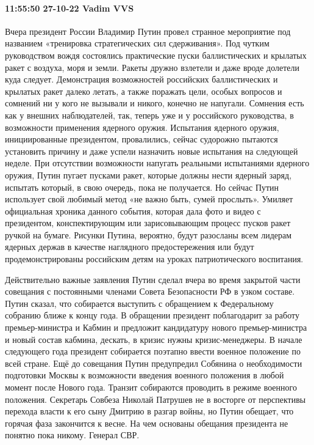 \paragraph{11:55:50 27-10-22 Vadim VVS}

Вчера президент России Владимир Путин провел странное мероприятие под названием
«тренировка стратегических сил сдерживания». Под чутким руководством вождя
состоялись практические пуски баллистических и крылатых ракет с воздуха, моря и
земли. Ракеты дружно взлетели и даже вроде долетели куда следует. Демонстрация
возможностей российских баллистических и крылатых ракет далеко летать, а также
поражать цели, особых вопросов и сомнений ни у кого не вызывали и никого,
конечно не напугали. Сомнения есть как у внешних наблюдателей, так, теперь уже
и у российского руководства, в возможности применения ядерного оружия.
Испытания ядерного оружия, инициированные президентом, провалились, сейчас
судорожно пытаются установить причину и даже успели назначить новые испытания
на следующей неделе. При отсутствии возможности напугать реальными испытаниями
ядерного оружия, Путин пугает пусками ракет, которые должны нести ядерный
заряд, испытать который, в свою очередь, пока не получается. Но сейчас Путин
использует свой любимый метод «не важно быть, сумей прослыть». Умиляет
официальная хроника данного события, которая дала фото и видео с президентом,
конспектирующим или зарисовывающим процесс пусков ракет ручкой на бумаге.
Рисунки Путина, вероятно, будут разосланы всем лидерам ядерных держав в
качестве наглядного предостережения или будут продемонстрированы российским
детям на уроках патриотического воспитания.

Действительно важные заявления Путин сделал вчера во время закрытой части
совещания с постоянными членами Совета Безопасности РФ в узком составе. Путин
сказал, что собирается выступить с обращением к Федеральному собранию ближе к
концу года. В обращении президент поблагодарит за работу премьер-министра и
Кабмин и предложит кандидатуру нового премьер-министра и новый состав кабмина,
дескать, в кризис нужны кризис-менеджеры. В начале следующего года президент
собирается поэтапно ввести военное положение по всей стране. Ещё до совещания
Путин предупредил Собянина о необходимости подготовки Москвы к возможности
введения военного положения в любой момент после Нового года. Транзит
собираются проводить в режиме военного положения. Секретарь Совбеза Николай
Патрушев не в восторге от перспективы перехода власти к его сыну Дмитрию в
разгар войны, но Путин обещает, что горячая фаза закончится к весне. На чем
основаны обещания президента не понятно пока никому. Генерал СВР.

